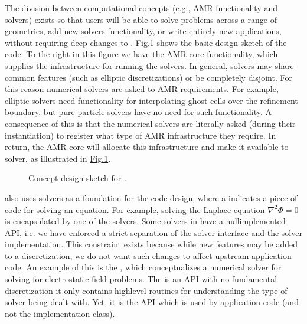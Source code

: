 \documentclass[letterpaper,10pt,english]{sphinxmanual}
\let\sphinxpxdimen\pdfpxdimen\else\newdimen\sphinxpxdimen
\begin{document}
\sphinxAtStartPar
The division between computational concepts (e.g., AMR functionality and solvers) exists so that users will be able to solve problems across a range of geometries, add new solvers functionality, or write entirely new applications, without requiring deep changes to .
\hyperref[\detokenize{Base/Overview:fig-design}]{Fig.\@ \ref{\detokenize{Base/Overview:fig-design}}} shows the basic design sketch of the  code.
To the right in this figure we have the AMR core functionality, which supplies the infrastructure for running the solvers.
In general, solvers may share common features (such as elliptic discretizations) or be completely disjoint.
For this reason numerical solvers are asked to  AMR requirements.
For example, elliptic solvers need functionality for interpolating ghost cells over the refinement boundary, but pure particle solvers have no need for such functionality.
A consequence of this is that the numerical solvers are literally asked (during their instantiation) to register what type of AMR infrastructure they require.
In return, the AMR core will allocate this infrastructure and make it available to solver, as illustrated in \hyperref[\detokenize{Base/Overview:fig-design}]{Fig.\@ \ref{\detokenize{Base/Overview:fig-design}}}.

\begin{figure}[htb]
\centering
\capstart

\noindent\sphinxincludegraphics[width=600\sphinxpxdimen]{{Design}.png}
\caption{Concept design sketch for .}\label{\detokenize{Base/Overview:id2}}\label{\detokenize{Base/Overview:fig-design}}\end{figure}

\sphinxAtStartPar
{} also uses  solvers as a foundation for the code design, where a  indicates a piece of code for solving an equation.
For example, solving the Laplace equation \(\nabla^2\Phi = 0\) is encapsulated by one of the  solvers.
Some solvers in  have a null\sphinxhyphen{}implemented API, i.e. we have enforced a strict separation of the solver interface and the solver implementation.
This constraint exists because while new features may be added to a discretization, we do not want such changes to affect upstream application code.
An example of this is the , which conceptualizes a numerical solver for solving for electrostatic field problems.
The  is an API with no fundamental discretization \textendash{} it only contains high\sphinxhyphen{}level routines for understanding the type of solver being dealt with.
Yet, it is the  API which is used by application code (and not the implementation class).
\end{document}
